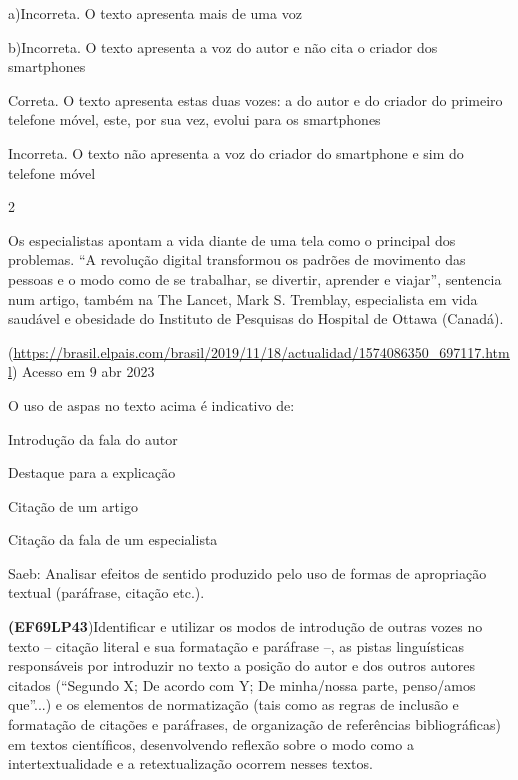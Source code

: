 {{\begin{escolha}
a)Incorreta. O texto apresenta mais de uma voz

b)Incorreta. O texto apresenta a voz do autor e não cita o criador dos
smartphones

\item
  Correta. O texto apresenta estas duas vozes: a do autor e do criador
  do primeiro telefone móvel, este, por sua vez, evolui para os
  smartphones
\item
  Incorreta. O texto não apresenta a voz do criador do smartphone e sim
  do telefone móvel

\num{2}

Os especialistas apontam a vida diante de uma tela como o principal dos
problemas. ``A revolução digital transformou os padrões de movimento das
pessoas e o modo como de se trabalhar, se divertir, aprender e viajar'',
sentencia num artigo, também na The Lancet, Mark S. Tremblay,
especialista em vida saudável e obesidade do Instituto de Pesquisas do
Hospital de Ottawa (Canadá).

(\href{https://brasil.elpais.com/brasil/2019/11/18/actualidad/1574086350_697117.html}{\uline{https://brasil.elpais.com/brasil/2019/11/18/actualidad/1574086350\_697117.html}})
Acesso em 9 abr 2023

O uso de aspas no texto acima é indicativo de:

\begin{escolha}

\item
  Introdução da fala do autor
\item
  Destaque para a explicação
\item
  Citação de um artigo
\item
  Citação da fala de um especialista
\end{escolha}

Saeb: Analisar efeitos de sentido produzido pelo uso de formas de
apropriação textual (paráfrase, citação etc.).

\textbf{(EF69LP43})Identificar e utilizar os modos de introdução de
outras vozes no texto -- citação literal e sua formatação e paráfrase
--, as pistas linguísticas responsáveis por introduzir no texto a
posição do autor e dos outros autores citados (``Segundo X; De acordo
com Y; De minha/nossa parte, penso/amos que''...) e os elementos de
normatização (tais como as regras de inclusão e formatação de citações e
paráfrases, de organização de referências bibliográficas) em textos
científicos, desenvolvendo reflexão sobre o modo como a
intertextualidade e a retextualização ocorrem nesses textos.


\end{escolha}}}
